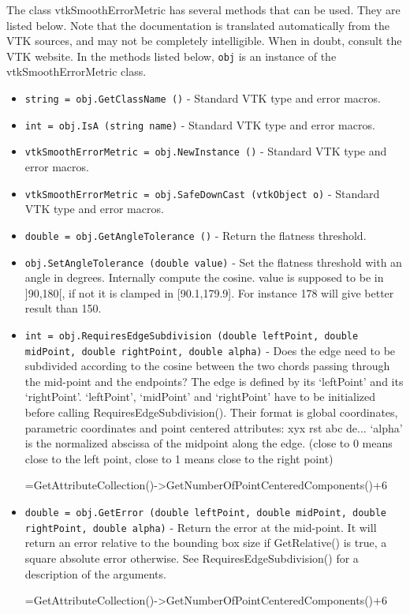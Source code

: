 The class vtkSmoothErrorMetric has several methods that can be used.
  They are listed below.
Note that the documentation is translated automatically from the VTK sources,
and may not be completely intelligible.  When in doubt, consult the VTK website.
In the methods listed below, \verb|obj| is an instance of the vtkSmoothErrorMetric class.
\begin{itemize}
\item  \verb|string = obj.GetClassName ()| -  Standard VTK type and error macros.

\item  \verb|int = obj.IsA (string name)| -  Standard VTK type and error macros.

\item  \verb|vtkSmoothErrorMetric = obj.NewInstance ()| -  Standard VTK type and error macros.

\item  \verb|vtkSmoothErrorMetric = obj.SafeDownCast (vtkObject o)| -  Standard VTK type and error macros.

\item  \verb|double = obj.GetAngleTolerance ()| -  Return the flatness threshold.
 

\item  \verb|obj.SetAngleTolerance (double value)| -  Set the flatness threshold with an angle in degrees. Internally
 compute the cosine. value is supposed to be in ]90,180[, if not
 it is clamped in [90.1,179.9].
 For instance 178  will give better result than 150.

\item  \verb|int = obj.RequiresEdgeSubdivision (double leftPoint, double midPoint, double rightPoint, double alpha)| -  Does the edge need to be subdivided according to the cosine between
 the two chords passing through the mid-point and the endpoints?
 The edge is defined by its `leftPoint' and its `rightPoint'.
 `leftPoint', `midPoint' and `rightPoint' have to be initialized before
 calling RequiresEdgeSubdivision().
 Their format is global coordinates, parametric coordinates and
 point centered attributes: xyx rst abc de...
 `alpha' is the normalized abscissa of the midpoint along the edge.
 (close to 0 means close to the left point, close to 1 means close to the
 right point)
 
 
 
 
 
          =GetAttributeCollection()->GetNumberOfPointCenteredComponents()+6

\item  \verb|double = obj.GetError (double leftPoint, double midPoint, double rightPoint, double alpha)| -  Return the error at the mid-point. It will return an error relative to
 the bounding box size if GetRelative() is true, a square absolute error
 otherwise.
 See RequiresEdgeSubdivision() for a description of the arguments.
 
 
 
 
 
          =GetAttributeCollection()->GetNumberOfPointCenteredComponents()+6
 

\end{itemize}
